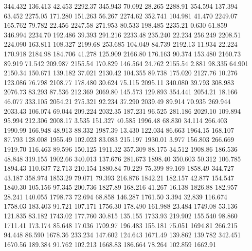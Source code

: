  344.432  136.413   42.453      2292.37
 345.943   70.092   28.265      2288.91
 354.594  137.394   63.452      2275.05
 171.280  151.263   56.267      2274.62
 352.741  104.981   41.470      2249.07
 165.762   79.782   22.456      2247.58
 271.953   80.533  198.485      2235.21
   0.630   61.859  346.994      2234.70
 192.486   39.393  291.216      2233.48
 235.240   22.234  256.249      2208.51
 224.090  163.811  108.327      2199.68
 253.685  104.049   84.739      2192.13
  11.934   22.224  170.918      2184.98
 184.706   41.278  125.909      2166.80
 176.163   90.374  153.480      2160.73
  89.919   71.542  209.987      2155.54
 170.829  146.564   24.762      2155.54
   2.881   98.335   64.901      2150.34
 150.671  139.182   37.021      2130.42
 104.355   89.738  175.020      2127.76
  10.276  123.086   76.798      2108.77
 178.480   30.624   75.115      2095.11
 340.080   39.793  308.983      2076.73
  83.293   87.536  212.369      2069.80
 145.573  129.893  354.441      2054.21
  18.166   46.077  333.105      2054.21
 275.321   92.234   37.290      2039.49
  89.914   70.935  269.944      2033.43
 106.074   69.044  209.224      2032.35
 187.231   96.525  281.186      2029.10
 109.894   95.994  212.306      2008.17
   3.535  151.327   40.585      1996.48
  68.830   34.114  266.403      1990.99
 166.948   48.913   88.332      1987.39
  13.430  122.034   86.663      1964.15
 168.107   87.793  128.008      1955.49
 102.023   83.083  215.197      1930.01
   3.977  156.803  266.669      1919.70
 116.463   89.596  150.125      1911.32
 357.309   88.175   34.512      1908.86
 186.536   48.848  319.155      1902.66
 340.013  137.676  281.673      1898.40
 350.603   50.312  106.785      1894.43
 110.637   72.713  210.154      1880.84
  70.229   75.399   89.169      1858.49
 344.727   43.187  358.974      1853.29
  79.071   79.393  216.876      1842.21
 182.157   42.877  154.547      1840.30
 105.156   97.345  200.736      1827.89
 168.216   41.267   16.138      1826.88
 182.957   28.241  140.055      1798.73
  72.694   68.858  146.287      1761.50
   3.394   32.839  116.674      1758.03
 183.403   91.721  107.171      1756.30
 178.490  161.988   23.484      1749.08
  53.136  121.835   83.182      1743.02
 177.760   30.815  135.155      1733.93
 219.902  155.540   98.860      1711.41
 173.174   85.648   17.036      1709.97
 196.483  155.181   75.051      1694.81
 266.215   94.448   86.590      1678.36
 233.234  147.602  124.643      1671.49
 139.862  139.782  342.451      1670.56
 189.384   91.762  102.213      1668.83
 186.664   78.264  102.859      1662.91

